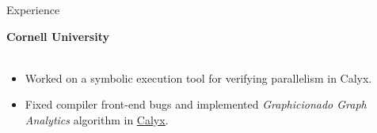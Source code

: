 \begin{rSection}{Experience}
	{\textbf{\large{Cornell University}} \hfill \color{darkgray}{10/2021 - 12/2022} 
	\\ \vspace*{1mm}
	 \hfill \color{darkgray}{Ithaca, NY}
	\\
	\color{black}
	\begin{minipage}{40em}
		\begin{itemize}
			\item Worked on a symbolic execution tool for verifying parallelism in Calyx.
			\item Fixed compiler front-end bugs and implemented \textit{Graphicionado Graph Analytics} algorithm in \href{https://docs.calyxir.org/contributors.html}{\underline{Calyx}}.
		\end{itemize}
	\end{minipage}} 

\end{rSection} 
